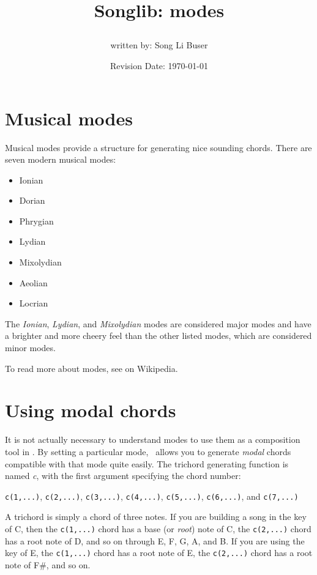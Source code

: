 \documentclass{article}
\title{Songlib: modes\\
\date{Revision Date: \today}}
\author{written by: Song Li Buser}
\begin{document}
\maketitle

\W\subsubsection*{}
\W\htmlrule

\section*{Musical modes}

Musical modes provide a structure for generating
nice sounding chords. There are seven modern
musical modes:

\begin{itemize}
\item Ionian
\item Dorian
\item Phrygian
\item Lydian
\item Mixolydian
\item Aeolian
\item Locrian
\end{itemize}

The {\it Ionian}, {\it Lydian}, and {\it Mixolydian} modes are considered
major modes and have a brighter and more cheery 
feel than the other listed modes, which are considered
minor modes.

To read more about modes, see
on Wikipedia.

\section*{Using modal chords}

It is not actually necessary to understand modes
to use them as a composition tool in \songlib.
By setting a particular mode, \songlib\ allows
you to generate {\it modal} chords compatible with that mode quite easily.
The trichord generating function
is named {\it c}, with the first argument specifying
the chord number:

\verb!c(1,...)!, \verb!c(2,...)!, \verb!c(3,...)!, \verb!c(4,...)!,
    \verb!c(5,...)!, \verb!c(6,...)!, and \verb!c(7,...)!

A trichord is simply a chord of three notes.
If you are building a song in the key of C, then the
\verb!c(1,...)! chord has a base (or {\it root}) note of C,
the \verb!c(2,...)! chord has a root
note of D, and so on through E, F, G, A, and B. If you
are using the key of E, the \verb!c(1,...)! chord has a root note
of E, the \verb!c(2,...)! chord has a root note of F\#, and so on.
\end{document}
